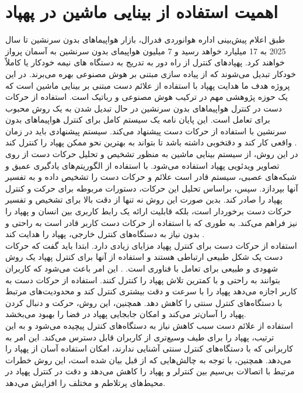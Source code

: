  \section{اهمیت استفاده از بینایی ماشین در پهپاد}
 طبق اعلام پیش‌بینی اداره هوانوردی فدرال، بازار هواپیماهای بدون سرنشین تا سال 2025 به 17 میلیارد خواهد رسید و 7 میلیون هواپیمای بدون سرنشین به آسمان پرواز خواهند‌ کرد. پهپادهای کنترل
 از راه دور به تدریج به دستگاه های نیمه خودکار یا کاملاً خودکار تبدیل می‌شوند که از پیاده سازی مبتنی بر هوش مصنوعی بهره می‌برند. 
 در این پروژه هدف ما هدایت پهپاد با استفاده از علائم دست مبتنی بر بینایی ماشین است که یک حوزه پژوهشی مهم در ترکیب هوش مصنوعی و رباتیک است. 
 استفاده از حرکات دست در کنترل هواپیماهای بدون سرنشین در حال تبدیل شدن به یک روش محبوب برای تعامل است. این پایان نامه یک سیستم کامل برای کنترل هواپیماهای بدون سرنشین 
 با استفاده از حرکات دست پیشنهاد می‌کند. سیستم پیشنهادی باید در زمان واقعی کار کند و دقتخوبی داشته باشد تا بتواند به بهترین نحو ممکن پهپاد را کنترل کند \cite{hadri2018hand}.
 \\
 در این روش، از سیستم بینایی ماشین به منظور تشخیص و تحلیل حرکات دست از روی تصاویر ویدئویی پهپاد استفاده می‌شود. با استفاده از الگوریتم‌های یادگیری عمیق و شبکه‌های عصبی، سیستم 
 قادر است علائم و حرکات دست را تشخیص داده و به تفسیر آنها بپردازد. سپس، براساس تحلیل این حرکات، دستورات مربوطه برای حرکت و کنترل پهپاد را صادر کند.
 بدین صورت این روش نه تنها از دقت بالا برای تشخیص و تفسیر حرکات دست برخوردار است، بلکه قابلیت ارائه یک رابط کاربری بین انسان و پهپاد را نیز فراهم می‌کند. 
 به طوری که با استفاده از حرکات دست کاربر قادر است به راحتی و بدون نیاز به دستگاه‌های کنترل خارجی، پهپاد را هدایت کند \cite{yoo2022motion}.
\\
استفاده از حرکات دست برای کنترل پهپاد مزایای زیادی دارد. ابتدا باید گفت که حرکات دست یک شکل طبیعی ارتباطی هستند و استفاده از آنها برای کنترل پهپاد یک روش شهودی و طبیعی برای تعامل با فناوری است.
. این امر باعث می‌شود که کاربران بتوانند به راحتی و با کمترین تلاش پهپاد را کنترل کنند. استفاده از حرکات دست به کاربر اجازه می‌دهد پهپاد را با سرعت و دقت
بیشتری کنترل کند و محدودیت‌های مرتبط با دستگاه‌های کنترل سنتی را کاهش دهد. همچنین، این روش، حرکت و دنبال کردن پهپاد را آسان‌تر می‌کند و امکان جابجایی پهپاد در فضا را بهبود می‌بخشد.
\\
استفاده از علائم دست سبب کاهش نیاز به دستگاه‌های کنترل پیچیده می‌شود و به این ترتیب، پهپاد را برای طیف وسیع‌تری از کاربران قابل دسترس می‌کند.
این امر به کاربرانی که با دستگاه‌های کنترل سنتی آشنایی ندارند، امکان استفاده آسان از پهپاد را می‌دهد. همچنین، با توجه به چالش‌هایی که از قبل بیان شده است، 
این روش خطرات مرتبط با اتصالات بی‌سیم بین کنترلر و پهپاد را کاهش می‌دهد و دقت در کنترل پهپاد در محیط‌های پرتلاطم و مختلف را افزایش می‌دهد. 

